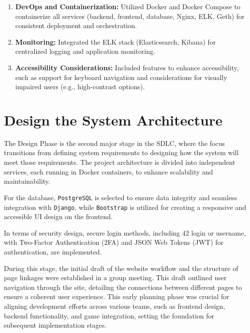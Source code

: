 \begin{enumerate}
    \item \textbf{DevOps and Containerization:} Utilized Docker and Docker Compose to containerize all services (backend, frontend, database, Nginx, ELK, Geth) for consistent deployment and orchestration.
    \item \textbf{Monitoring:} Integrated the ELK stack (Elasticsearch, Kibana) for centralized logging and application monitoring.
    \item \textbf{Accessibility Considerations:} Included features to enhance accessibility, such as support for keyboard navigation and considerations for visually impaired users (e.g., high-contrast options).
\end{enumerate}

\section{Design the System Architecture}
The Design Phase is the second major stage in the SDLC, where the focus transitions from defining system requirements to designing how the system will meet those requirements. The project architecture is divided into independent services, each running in Docker containers, to enhance scalability and maintainability.

For the database, \texttt{PostgreSQL} is selected to ensure data integrity and seamless integration with \texttt{Django}, while \texttt{Bootstrap} is utilized for creating a responsive and accessible UI design on the frontend.

In terms of security design, secure login methods, including 42 login or username, with Two-Factor Authentication (2FA) and JSON Web Tokens (JWT) for authentication, are implemented.

During this stage, the initial draft of the website workflow and the structure of page linkages were established in a group meeting. This draft outlined user navigation through the site, detailing the connections between different pages to ensure a coherent user experience. This early planning phase was crucial for aligning development efforts across various teams, such as frontend design, backend functionality, and game integration, setting the foundation for subsequent implementation stages.

